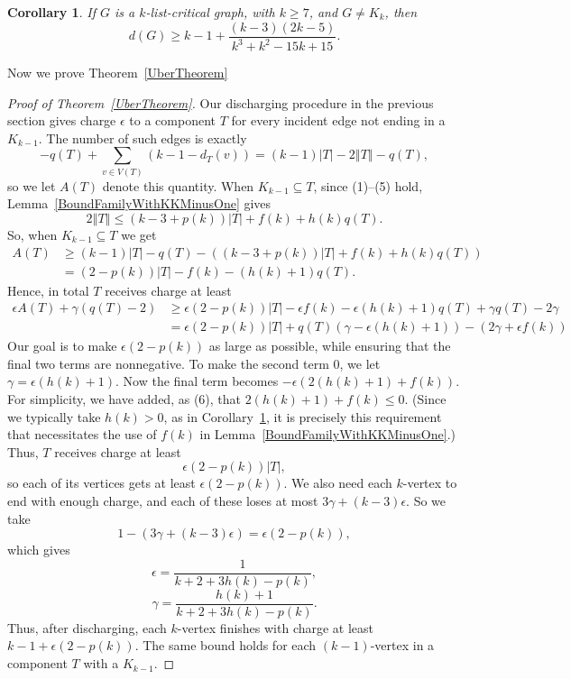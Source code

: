 \documentclass[12pt]{article}
\theoremstyle{plain}
\newtheorem{cor}[thm]{Corollary}
\theoremstyle{definition}
\theoremstyle{remark}
\newcommand{\set}[1]{\left\{ #1 \right\}}
\newcommand{\card}[1]{\left|#1\right|}
\newcommand{\size}[1]{\left\Vert#1\right\Vert}
\newcommand{\parens}[1]{\left( #1 \right)}
\begin{document}
\begin{cor}\label{MainCor}
If $G$ is a $k$-list-critical graph, with $k\ge 7$, and $G\ne K_k$, then
 \[d(G) \ge k-1 + \frac{(k-3)(2k-5)}{k^3 + k^2 - 15k + 15}.\]
\end{cor}

Now we prove Theorem~\ref{UberTheorem}
\begin{proof}[Proof of Theorem~\ref{UberTheorem}]
Our discharging procedure in the previous section gives charge $\epsilon$ to a component $T$ for every incident edge not ending in a $K_{k-1}$.  The number of such edges is exactly
%
\[-q(T) + \sum_{v \in V(T)} (k-1 - d_T(v)) = (k-1)\card{T} - 2\size{T} - q(T),\]
%
so we let $A(T)$ denote this quantity.  When $K_{k-1} \subseteq T$, since
(1)--(5) hold, Lemma~\ref{BoundFamilyWithKKMinusOne} gives
%
\[2\size{T} \le (k-3 + p(k))\card{T} + f(k) + h(k)q(T).\]
%
So, when $K_{k-1} \subseteq T$ we get
%
\begin{align*}
    A(T) & \ge (k-1)\card{T} - q(T) - ((k-3 + p(k))\card{T} + f(k) + h(k)q(T))\\
         &  =(2-p(k))\card{T} - f(k) - (h(k) + 1)q(T).
\end{align*}
Hence, in total $T$ receives charge at least
\begin{align*}
    \epsilon A(T) + \gamma(q(T) - 2) &\ge \epsilon(2-p(k))|T| - \epsilon f(k) - \epsilon (h(k)+1)q(T) +\gamma q(T)-2\gamma \\
    & = \epsilon(2-p(k))|T| + q(T)(\gamma - \epsilon (h(k)+1)) - (2\gamma + \epsilon f(k))
\end{align*}
%
Our goal is to make $\epsilon(2-p(k))$ as large as possible, while ensuring that the final two terms are nonnegative.  To make the second term 0, we let $\gamma = \epsilon(h(k) + 1)$.  Now the final term becomes $-\epsilon(2(h(k)+1)+f(k))$.
%
%
For simplicity, we have added, as (6), that $2(h(k) + 1) + f(k) \le 0$.  (Since we typically take $h(k) > 0$, as in Corollary~\ref{MainCor}, it is precisely this requirement that necessitates the use of $f(k)$ in Lemma~\ref{BoundFamilyWithKKMinusOne}.)  Thus, $T$ receives charge at least
\[\epsilon\parens{2-p(k)}\card{T},\]
so each of its vertices gets at least $\epsilon(2-p(k))$.
We also need each $k$-vertex to end with enough charge, and each of these loses at most $3\gamma+(k-3)\epsilon$.  So we take
\[1 - (3\gamma + (k-3)\epsilon) = \epsilon\parens{2-p(k)},\]
which gives
\[\epsilon = \frac{1}{k+2 + 3h(k) - p(k)},\]
\[\gamma = \frac{h(k)+1}{k+2 + 3h(k) - p(k)}.\]
Thus, after discharging, each $k$-vertex finishes with charge at least $k-1+\epsilon(2-p(k))$.  The same bound holds for each $(k-1)$-vertex in a component $T$ with a $K_{k-1}$.


\end{proof}
\end{document}
